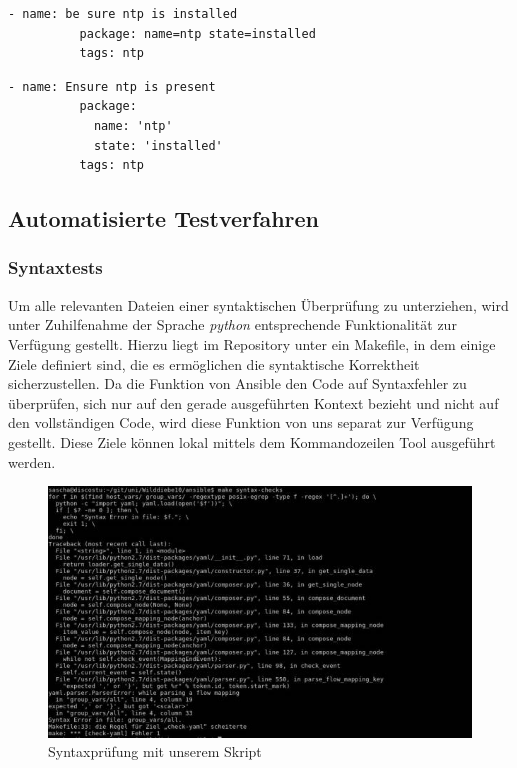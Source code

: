 \begin{minipage}{\textwidth}
\begin{lstlisting}[label=code:ansiblebpbad,caption=Formatierung nach Standard]
        - name: be sure ntp is installed
          package: name=ntp state=installed
          tags: ntp
\end{lstlisting}
\end{minipage}

\begin{lstlisting}[label=code:ansiblebpgood,caption=Unsere verwendete Formatierung]
        - name: Ensure ntp is present
          package:
            name: 'ntp'
            state: 'installed'
          tags: ntp
\end{lstlisting}

\subsection{Automatisierte Testverfahren}
\subsubsection{Syntaxtests}
Um alle relevanten Dateien einer syntaktischen Überprüfung zu unterziehen, wird unter Zuhilfenahme der Sprache \emph{python} entsprechende Funktionalität zur Verfügung gestellt. Hierzu liegt im Repository unter  ein Makefile, in dem einige Ziele definiert sind, die es ermöglichen die syntaktische Korrektheit sicherzustellen. Da die Funktion von Ansible den Code auf Syntaxfehler zu überprüfen, sich nur auf den gerade ausgeführten Kontext bezieht und nicht auf den vollständigen Code, wird diese Funktion von uns separat zur Verfügung gestellt. Diese Ziele können lokal mittels dem Kommandozeilen Tool  ausgeführt werden.

\begin{figure}[!htbp]
	\centering
		\includegraphics[scale=0.75]{images/syntaxchecks.jpg}
	\caption{Syntaxprüfung mit unserem Skript}
	\label{img:syntaxcheck}
\end{figure}

